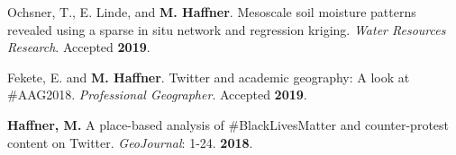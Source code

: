 



\begin{cventries}

  \cventry
  {}
  {}
  {}
  {}
  {
    \begin{cvitems}
      \vspace{-4mm}
    \item
      {Ochsner, T., E. Linde, and \textbf{M. Haffner}.
        Mesoscale soil moisture patterns revealed using a sparse in situ network
        and regression kriging.
        \textit{Water Resources Research}. Accepted \textbf{2019}.} \\
      \vspace{-2mm}
    \end{cvitems}
  }

  \cventry
  {}
  {}
  {}
  {}
  {
    \begin{cvitems}
      \vspace{-4mm}
    \item
      {Fekete, E. and \textbf{M. Haffner}.
        Twitter and academic geography: A look at \#AAG2018.
        \textit{Professional Geographer}. Accepted \textbf{2019}.} \\
      \vspace{-2mm}
    \end{cvitems}
  }

   \cventry
      {}
      {}
      {}
      {}
      {
        \begin{cvitems}
          \vspace{-4mm}
        \item
          {\textbf{Haffner, M.}
            A place-based analysis of \#BlackLivesMatter and counter-protest
            content on Twitter. \textit{GeoJournal}: 1-24. \textbf{2018}.} \\
          \vspace{-2mm}
        \end{cvitems}
    }


\end{cventries}
